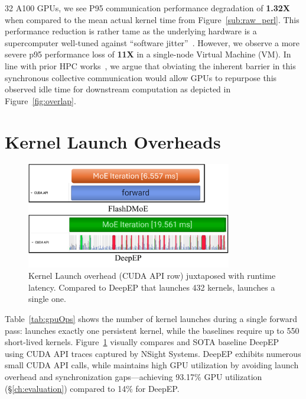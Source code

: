 32 A100 GPUs, we see P95 communication performance degradation of \textbf{1.32X} when compared to the mean actual kernel time
from Figure~\ref{sub:raw_perl}.
This performance reduction is rather tame as the underlying hardware is a supercomputer well-tuned
against ``software jitter''~\cite{nerscNetworkNERSC}.
However, we observe a more severe p95 performance loss of \textbf{11X} in a single-node Virtual Machine (VM).
In line with prior HPC works~\cite{1639320, 10.1145/3545008.3545056},
we argue that obviating the inherent barrier in this synchronous collective communication would
allow GPUs to repurpose this observed idle time for downstream computation as depicted in Figure~\ref{fig:overlap}.
\section{Kernel Launch Overheads}\label{sec:kernel-launch-overheads}
\begin{figure}[!ht]
    \centering
    \includegraphics[width=0.8\textwidth, keepaspectratio]{figures/kernel_launch}
    \caption{Kernel Launch overhead (CUDA API row) juxtaposed with runtime latency.
    Compared to DeepEP that launches 432 kernels, \sysname launches a single one.}
    \label{fig:kl}
\end{figure}
Table~\ref{tab:gpuOps} shows the number of kernel launches during a single forward pass:
\sysname launches exactly one persistent kernel, 
while the baselines require up to 550 short-lived kernels.
Figure~\ref{fig:kl} visually compares \sysname and SOTA baseline DeepEP~\cite{deepep} using CUDA API
traces captured by NSight Systems.
DeepEP exhibits numerous small CUDA API calls, while \sysname maintains high GPU
utilization by avoiding launch overhead and
synchronization gaps—achieving 93.17\% GPU utilization (\S\ref{ch:evaluation}) compared to 14\% for DeepEP.